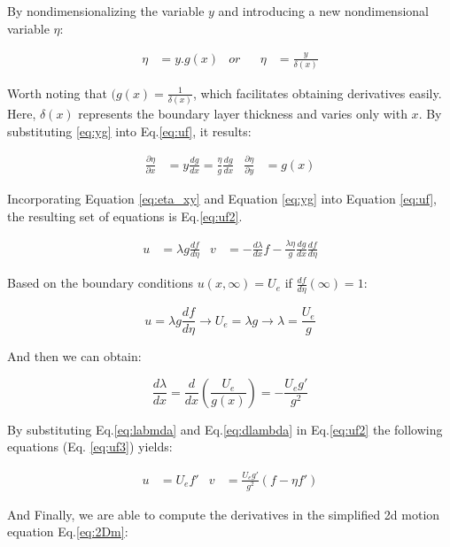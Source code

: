 \documentclass[]{report}
\begin{document}
By nondimensionalizing the variable $y$ and introducing a new nondimensional variable $\eta$:

\begin{align}
    \label{eq:yg}
    \eta &= y.g(x) & or& & \eta &= \frac{y}{\delta(x)} 
\end{align}

Worth noting that $(g(x) = \frac{1}{\delta(x)}$, which facilitates obtaining derivatives easily. Here, $\delta(x)$ represents the boundary layer thickness and varies only with $x$. By substituting \ref{eq:yg} into Eq.\ref{eq:uf}, it results:

\begin{align}
\label{eq:eta_xy}
\frac{\partial \eta}{\partial x} &= y\frac{dg}{dx} = \frac{\eta}{g}\frac{dg}{dx}
&
\frac{\partial \eta}{\partial y} &= g(x)
\end{align}

Incorporating Equation \ref{eq:eta_xy} and Equation \ref{eq:yg} into Equation \ref{eq:uf}, the resulting set of equations is Eq.\ref{eq:uf2}.

\begin{align}
\label{eq:uf2}
    u &= \lambda g \frac{df}{d\eta}
    &
    v &= - \frac{d\lambda}{dx} f -  \frac{\lambda \eta}{g} \frac{dg}{dx}\frac{df}{d\eta}
\end{align}

Based on the boundary conditions $u(x,\infty) = U_e$ if $\frac{df}{d \eta}(\infty) = 1$:

\begin{equation}
    \label{eq:labmda}
    u = \lambda g \frac{df}{d\eta} \longrightarrow U_e = \lambda g \longrightarrow \lambda = \frac{U_e}{g}
\end{equation}

And then we can obtain:

\begin{equation}
    \label{eq:dlambda}
    \frac{d\lambda}{d x} = \frac{d}{dx}(\frac{U_e}{g(x)}) = - \frac{U_eg'}{g^2}
\end{equation}

By substituting Eq.\ref{eq:labmda} and Eq.\ref{eq:dlambda} in Eq.\ref{eq:uf2} the following equations (Eq. \ref{eq:uf3}) yields:

\begin{align}
\label{eq:uf3}
    u &= U_e f' 
    &
    v &= \frac{U_e g'}{g^2}(f - \eta f')
\end{align}

And Finally, we are able to compute the derivatives in the simplified 2d motion equation Eq.\ref{eq:2Dm}:
\end{document}
